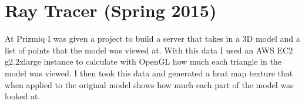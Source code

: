 
\section{Ray Tracer (Spring 2015)}

At Prizmiq I was given a project to build a server that takes in
a 3D model and a list of points that the model was viewed at.
With this data I used an AWS EC2 g2.2xlarge instance to calculate with
OpenGL how much each triangle in the model was viewed.
I then took this data and generated a heat map texture that when applied to the
original model shows how much each part of the model was looked at.


